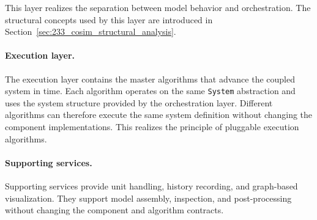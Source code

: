 This layer realizes the separation between model behavior and orchestration.
The structural concepts used by this layer are introduced in Section~\ref{sec:233_cosim_structural_analysis}.

\paragraph{Execution layer.}
The execution layer contains the master algorithms that advance the coupled system in time.
Each algorithm operates on the same \texttt{System} abstraction and uses the system structure provided by the orchestration layer.
Different algorithms can therefore execute the same system definition without changing the component implementations.
This realizes the principle of pluggable execution algorithms.

\paragraph{Supporting services.}
Supporting services provide unit handling, history recording, and graph-based visualization.
They support model assembly, inspection, and post-processing without changing the component and algorithm contracts.
